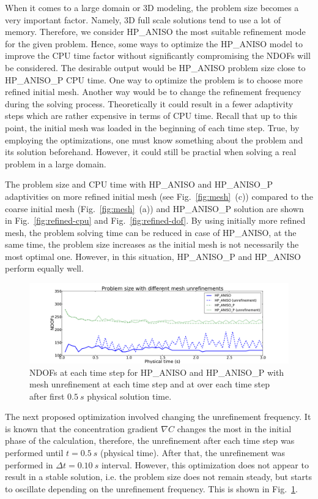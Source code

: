 When it comes to a large domain or 3D modeling, the problem
size becomes a very important factor. Namely, 3D full scale solutions tend to use
a lot of memory. Therefore, we consider HP\_ANISO the most
suitable refinement mode for the given problem. 
Hence, some ways to optimize the HP\_ANISO model
to improve the CPU time factor without significantly 
compromising the NDOFs will be considered. 
The desirable output would be HP\_ANISO problem size
close to HP\_ANISO\_P CPU time. 
One way to optimize the problem
is to choose more refined initial mesh. Another way would be to change
the refinement frequency during the solving process. Theoretically it 
could result in a fewer adaptivity steps which are rather expensive in terms
of CPU time. Recall that up to this point,
the initial mesh was loaded in the beginning of each time step. 
True, by employing the optimizations, one must know something about the problem
and its solution beforehand. However, it could still be practial when solving a real problem
in a large domain.

The problem size and CPU time with HP\_ANISO
and HP\_ANISO\_P adaptivities on more refined initial mesh (see Fig.~\ref{fig:mesh}~(c))
compared to the coarse initial mesh (Fig.~\ref{fig:mesh}~(a)) and 
HP\_ANISO\_P solution are shown in Fig.~\ref{fig:refined-cpu} and Fig.~\ref{fig:refined-dof}.
By using initially more refined mesh, the problem solving time
can be reduced in case of HP\_ANISO, at the same time, the problem size increases
as the initial mesh is not necessarily the most optimal one.
However, in this situation, HP\_ANISO\_P and HP\_ANISO perform equally well.

\begin{figure}[!ht]
  \begin{centering}
  \includegraphics[width=\columnwidth]{unreffreq_dof}
  \caption{\label{fig:unreffreq-dof} NDOFs at each time step for
  HP\_ANISO and HP\_ANISO\_P with mesh unrefinement at each time step and at over each
  	time step after first $0.5\ s$ physical solution time.}
  \end{centering}
\end{figure}
The next proposed optimization involved changing the unrefinement frequency.
It is known that the concentration gradient $\nabla C$ changes the most in the initial phase
of the calculation, therefore, the unrefinement after each time step was performed
until $t=0.5\ s$ (physical time). After that, the
unrefinement was performed in $\Delta t = 0.10\ s$ interval.
However, this optimization does not appear to result in a stable solution, 
i.e. the problem size 
does not remain steady, but starts to oscillate depending on the unrefinement
frequency. This is shown in Fig.~\ref{fig:unreffreq-dof}. 

